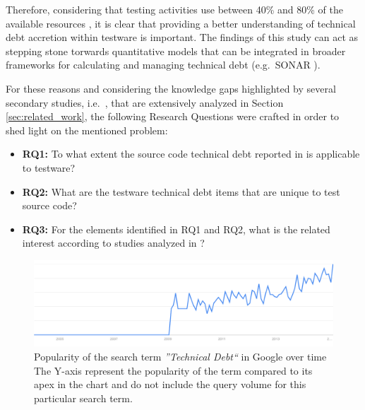 Therefore, considering that testing activities use between 40\% and 80\% of the available resources \cite{exploratorying_testing_td}, it is clear that providing a better understanding of technical debt accretion within testware is important. The findings of this study can act as stepping stone torwards quantitative models that can be integrated in broader frameworks for calculating and managing technical debt (e.g.\ SONAR \cite{sonar_evaluate_td}).

For these reasons and considering the knowledge gaps highlighted by several secondary studies, i.e.\ \cite{mapping_study_td, exploration_of_td, exploration_of_td2}, that are extensively analyzed in Section \ref{sec:related_work}, the following Research Questions were crafted in order to shed light on the mentioned problem:

\begin{itemize}
    \itemsep0em

    \item \textbf{RQ1:} To what extent the source code technical debt reported in \cite{mapping_study_td} is applicable to testware?

    \item \textbf{RQ2:} What are the testware technical debt items that are unique to test source code?

    \item \textbf{RQ3:} For the elements identified in RQ1 and RQ2, what is the related interest according to studies analyzed in \cite{mapping_study_td}?

\end{itemize}

\begin{figure}[h]
\centering
\includegraphics[width=\textwidth]{figure/technicalDebt.pdf}
\caption[Popularity of the search term \textit{''Technical Debt``} in Google over time.]{Popularity of the search term \textit{''Technical Debt``} in Google over time The Y-axis represent the popularity of the term compared to its apex in the chart and do not include the query volume for this particular search term.}
\label{fig:technical_debt_trend}
\end{figure}



